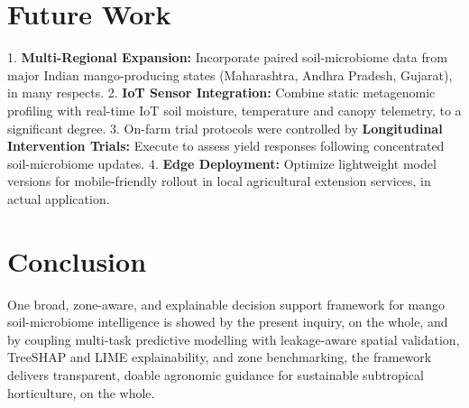 \documentclass[runningheads,a4paper,oribibl]{llncs}
\begin{document}
\section{Future Work}

1. \textbf{Multi-Regional Expansion:} Incorporate paired soil-microbiome data from major Indian mango-producing states (Maharashtra, Andhra Pradesh, Gujarat), in many respects.
2. \textbf{IoT Sensor Integration:} Combine static metagenomic profiling with real-time IoT soil moisture, temperature and canopy telemetry, to a significant degree.
3. On-farm trial protocols were controlled by \textbf{Longitudinal Intervention Trials:} Execute to assess yield responses following concentrated soil-microbiome updates.
4. \textbf{Edge Deployment:} Optimize lightweight model versions for mobile-friendly rollout in local agricultural extension services, in actual application.


\section{Conclusion}

One broad, zone-aware, and explainable decision support framework for mango soil-microbiome intelligence is showed by the present inquiry, on the whole, and by coupling multi-task predictive modelling with leakage-aware spatial validation, TreeSHAP and LIME explainability, and zone benchmarking, the framework delivers transparent, doable agronomic guidance for sustainable subtropical horticulture, on the whole.
\end{document}
